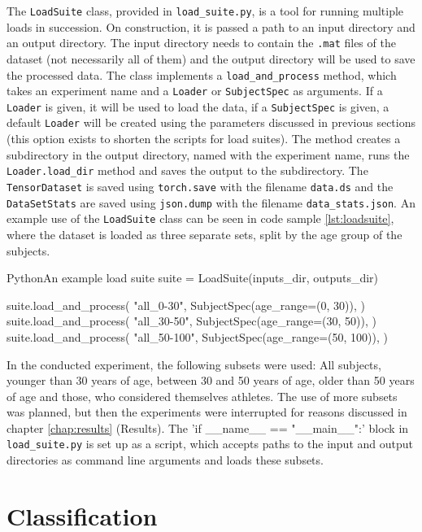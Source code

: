 \documentclass[english, he, bc, kiv, iso690alph]{fasthesis}
\begin{document}
The \texttt{LoadSuite} class, provided in \texttt{load\_suite.py}, is a tool for running multiple loads in succession. On construction, it is passed a path to an input directory and an output directory. The input directory needs to contain the \texttt{.mat} files of the dataset (not necessarily all of them) and the output directory will be used to save the processed data.
The class implements a \texttt{load\_and\_process} method, which takes an experiment name and a \texttt{Loader} or \texttt{SubjectSpec} as arguments. If a \texttt{Loader} is given, it will be used to load the data, if a \texttt{SubjectSpec} is given, a default \texttt{Loader} will be created using the parameters discussed in previous sections (this option exists to shorten the scripts for load suites).
The method creates a subdirectory in the output directory, named with the experiment name, runs the \texttt{Loader.load\_dir} method and saves the output to the subdirectory. The \texttt{TensorDataset} is saved using \texttt{torch.save} with the filename \texttt{data.ds} and the \texttt{DataSetStats} are saved using \texttt{json.dump} with the filename \texttt{data\_stats.json}. An example use of the \texttt{LoadSuite} class can be seen in code sample \ref{lst:loadsuite}, where the dataset is loaded as three separate sets, split by the age group of the subjects.

\begin{code}{Python}{An example load suite\label{lst:loadsuite}}
	suite = LoadSuite(inputs_dir, outputs_dir)

	suite.load_and_process(
	"all_0-30",
	SubjectSpec(age_range=(0, 30)),
	)
	suite.load_and_process(
	"all_30-50",
	SubjectSpec(age_range=(30, 50)),
	)
	suite.load_and_process(
	"all_50-100",
	SubjectSpec(age_range=(50, 100)),
	)
\end{code}


In the conducted experiment, the following subsets were used: All subjects, younger than 30 years of age, between 30 and 50 years of age, older than 50 years of age and those, who considered themselves athletes. The use of more subsets was planned, but then the experiments were interrupted for reasons discussed in chapter \ref{chap:results} (Results). The \command'if __name__ == "__main__":' block in \texttt{load\_suite.py} is set up as a script, which accepts paths to the input and output directories as command line arguments and loads these subsets.

\section{Classification}
\label{sec:classification}
\end{document}
